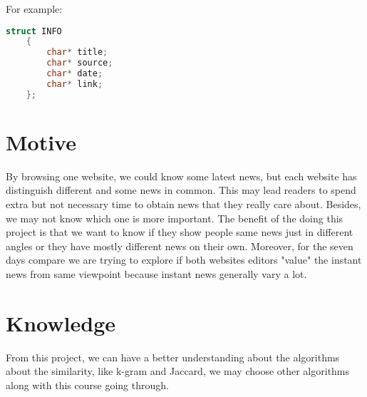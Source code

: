 \documentclass[11pt]{article}
\begin{document}
For example:
\begin{lstlisting}[language=C]
    struct INFO
    {
	    char* title;
	    char* source;
	    char* date;
	    char* link;
    };
\end{lstlisting}

\section{Motive}
By browsing one website, we could know some latest news, but each website has distinguish different and some news in common. This may lead readers to spend extra but not necessary time to obtain news that they really care about. Besides, we may not know which one is more important. The benefit of the doing this project is that we want to know if they show people same news just in different angles or they have mostly different news on their own. Moreover, for the seven days compare we are trying to explore if both websites editors "value" the instant news from same viewpoint because instant news generally vary a lot.

\section{Knowledge}
From this project, we can have a better understanding about the algorithms about the similarity, like k-gram and Jaccard, we may choose other algorithms along with this course going through.
\end{document}
